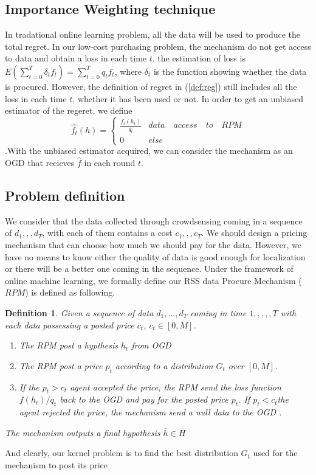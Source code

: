 \documentclass[10pt,conference,compsocconf,letterpaper]{IEEEtran}
\newtheorem{definition}{Definition}
\begin{document}
\subsection{Importance Weighting technique}

In tradational online learning problem, all the data will be used to produce the total regret. In our low-cost purchasing problem, the mechanism do not get access to data and obtain a loss in each time $t$.  the estimation of loss is $E(\sum_{t=0}^T\delta_t f_t)=\sum_{t=0}^T q_t f_t$, where $\delta_t$ is the function showing whether the data is procured. However, the definition of regret in (\ref{def:reg}) still includes all the loss in each time $t$, whether it has been used or not.  In order to get an unbiased estimator of the regeret, we define
\begin{equation}
\hat{f_t}(h)=\begin{cases}{}
  \frac{f_t(h_t)}{q_t} & data\quad access\quad to\quad RPM  \\
  0 & else 
\end{cases}
\end{equation}
.With the unbiased estimator acquired, we can consider the mechanism as an OGD that recieves $\hat{f}$ in each round $t$.


\subsection{Problem definition}
We consider that the data collected through crowdsensing coming in a sequence of $d_1,,,d_T$, with each of them contains a cost $c_1,,,c_T$. We should design a pricing mechanism that can choose how much we should pay for the data. However, we have no means to know either the quality of data is good enough for localization or there will be a better one coming in the sequence. Under the framework of online machine learning, we formally define our RSS data Procure Mechanism ($RPM$) is defined as following.
\begin{definition}{}\label{def:1}
Given a sequence of data ${d_1,...,d_T}$ coming in time $1,,,,,T$ with each data possessing a posted price $c_t$, $c_t\in [0,M]$. 
\begin{enumerate}
\item The RPM post a hypthesis $h_t$ from OGD
\item The RPM post a price $p_t$ according to a distribution $G_t$ over $[0,M]$.
\item If the $p_t>c_t$ agent accepted the price, the RPM send the loss function $f(h_t)/q_t$ back to the OGD and pay for the posted price $p_t$. If $p_t<c_t$the agent rejected the price, the mechanism send a null data to the OGD . 
\end{enumerate}
The mechanism outputs a final hypothesis $\overline{h}\in H$
\end{definition}
And clearly, our kernel problem is to find the best distribution $G_t$ used for the mechanism to post its price 
\end{document}
